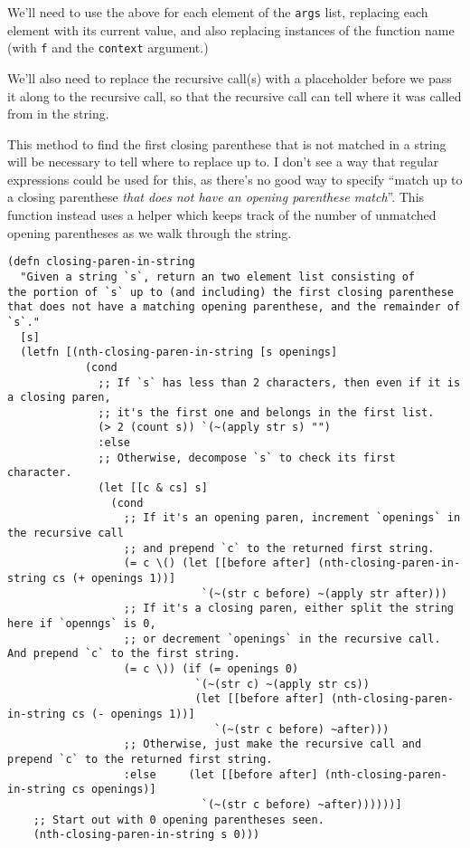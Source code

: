 \documentclass[11pt]{article}
\begin{document}
We'll need to use the above for each element of the \texttt{args} list,
replacing each element with its current value,
and also replacing instances of the function name
(with \texttt{f} and the \texttt{context} argument.)

We'll also need to replace the recursive call(s) with
a placeholder before we pass it along to the recursive call,
so that the recursive call can tell where it was called from
in the string.

This method to find the first closing parenthese that is not matched
in a string will be necessary to tell where to replace up to.
I don't see a way that regular expressions could be used for this,
as there's no good way to specify “match up to
a closing parenthese \emph{that does not have an opening parenthese match}”.
This function instead uses a helper which keeps track of the number
of unmatched opening parentheses as we walk through the string.
\begin{verbatim}
(defn closing-paren-in-string
  "Given a string `s`, return an two element list consisting of
the portion of `s` up to (and including) the first closing parenthese
that does not have a matching opening parenthese, and the remainder of `s`."
  [s]
  (letfn [(nth-closing-paren-in-string [s openings]
            (cond
              ;; If `s` has less than 2 characters, then even if it is a closing paren,
              ;; it's the first one and belongs in the first list.
              (> 2 (count s)) `(~(apply str s) "")
              :else
              ;; Otherwise, decompose `s` to check its first character.
              (let [[c & cs] s]
                (cond
                  ;; If it's an opening paren, increment `openings` in the recursive call
                  ;; and prepend `c` to the returned first string.
                  (= c \() (let [[before after] (nth-closing-paren-in-string cs (+ openings 1))]
                              `(~(str c before) ~(apply str after)))
                  ;; If it's a closing paren, either split the string here if `openngs` is 0,
                  ;; or decrement `openings` in the recursive call. And prepend `c` to the first string.
                  (= c \)) (if (= openings 0)
                             `(~(str c) ~(apply str cs))
                             (let [[before after] (nth-closing-paren-in-string cs (- openings 1))]
                                `(~(str c before) ~after)))
                  ;; Otherwise, just make the recursive call and prepend `c` to the returned first string.
                  :else     (let [[before after] (nth-closing-paren-in-string cs openings)]
                              `(~(str c before) ~after))))))]
    ;; Start out with 0 opening parentheses seen.
    (nth-closing-paren-in-string s 0)))
\end{verbatim}
\end{document}
